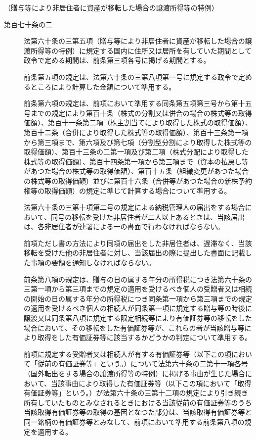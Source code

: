 \documentclass[twocolumn,a4j,10pt]{ltjtarticle}
\begin{document}
\noindent\hspace{10pt}（贈与等により非居住者に資産が移転した場合の譲渡所得等の特例）
\begin{description}
\item[第百七十条の二]法第六十条の三第五項（贈与等により非居住者に資産が移転した場合の譲渡所得等の特例）に規定する国内に住所又は居所を有していた期間として政令で定める期間は、前条第三項各号に掲げる期間とする。
\item[]前条第五項の規定は、法第六十条の三第八項第一号に規定する政令で定めるところにより計算した金額について準用する。
\item[]前条第六項の規定は、前項において準用する同条第五項第三号から第十五号までの規定により第百十条（株式の分割又は併合の場合の株式等の取得価額）、第百十一条第二項（株主割当てにより取得した株式の取得価額）、第百十二条（合併により取得した株式等の取得価額）、第百十三条第一項から第三項まで、第六項及び第七項（分割型分割により取得した株式等の取得価額）、第百十三条の二第一項及び第二項（株式分配により取得した株式等の取得価額）、第百十四条第一項から第三項まで（資本の払戻し等があつた場合の株式等の取得価額）、第百十五条（組織変更があつた場合の株式等の取得価額）並びに第百十六条（合併等があつた場合の新株予約権等の取得価額）の規定に準じて計算する場合について準用する。
\item[]法第六十条の三第十項第二号の規定による納税管理人の届出をする場合において、同号の移転を受けた非居住者が二人以上あるときは、当該届出は、各非居住者が連署による一の書面で行わなければならない。
\item[]前項ただし書の方法により同項の届出をした非居住者は、遅滞なく、当該移転を受けた他の非居住者に対し、当該届出の際に提出した書面に記載した事項の要領を通知しなければならない。
\item[]前条第八項の規定は、贈与の日の属する年分の所得税につき法第六十条の三第一項から第三項までの規定の適用を受けるべき個人の受贈者又は相続の開始の日の属する年分の所得税につき同条第一項から第三項までの規定の適用を受けるべき個人の相続人が同条第一項に規定する贈与等の時後に譲渡又は同条第八項に規定する限定相続等により有価証券等の移転をした場合において、その移転をした有価証券等が、これらの者が当該贈与等により取得をした有価証券等に該当するかどうかの判定について準用する。
\item[]前項に規定する受贈者又は相続人が有する有価証券等（以下この項において「従前の有価証券等」という。）について法第六十条の二第十一項各号（国外転出をする場合の譲渡所得等の特例）に掲げる事由が生じた場合において、当該事由により取得した有価証券等（以下この項において「取得有価証券等」という。）が法第六十条の三第十二項の規定により引き続き所有していたものとみなされるときにおける当該従前の有価証券等のうち当該取得有価証券等の取得の基因となつた部分は、当該取得有価証券等と同一銘柄の有価証券等とみなして、前項において準用する前条第八項の規定を適用する。
\end{description}
\end{document}
